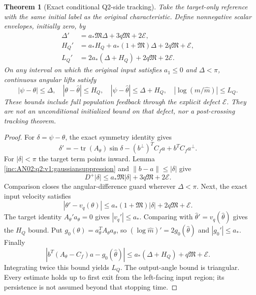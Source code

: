 \documentclass[11pt]{article}
\numberwithin{equation}{section}
\newtheorem{theorem}{Theorem}[section]\newtheorem{lemma}[theorem]{Lemma}
\theoremstyle{remark}\newtheorem{remark}[theorem]{Remark}
\begin{document}
\begin{theorem}[Exact conditional Q2-side tracking]
\label{inc:AN02:q2:v1:originaltracking}
Take the target-only reference with the same initial label as the original
characteristic. Define nonnegative scalar envelopes, initially zero, by
\begin{align}
 \Delta'&=a_*\mathfrak M\Delta+3q\mathfrak M+2\mathcal E,
 \label{inc:AN02:q2:v1:envelopes}\\
 H_Q'&=a_*H_Q+a_*(1+\mathfrak M)\Delta
                       +2q\mathfrak M+\mathcal E,\nonumber\\
 L_Q'&=2a_*(\Delta+H_Q)+2q\mathfrak M+2\mathcal E.\nonumber
\end{align}
On any interval on which the original input satisfies $a_1\le0$
and $\Delta<\pi$, continuous angular lifts satisfy
\begin{equation}\label{inc:AN02:q2:v1:trackingbounds}
 |\psi-\theta|\le\Delta,\quad
 |\theta-\widehat\theta|\le H_Q,\quad
 |\psi-\widehat\theta|\le\Delta+H_Q,\quad
 |\log(m/\widehat m)|\le L_Q.
\end{equation}
These bounds include full population feedback through the explicit defect
$\mathcal E$. They are not an unconditional initialized bound on that
defect, nor a post-crossing tracking theorem.
\end{theorem}
\begin{proof}
For $\delta=\psi-\theta$, the exact symmetry identity gives
\[
 \delta'=-\operatorname{tr}(A_\theta)\sin\delta
 -(b^\perp)^TC_fa+b^TC_fa^\perp.
\]
For $|\delta|<\pi$ the target term points inward. Lemma
\ref{inc:AN02:q2:v1:gaussiansuppression} and $\|b-a\|\le|\delta|$
give
\[
 D^+|\delta|\le a_*\mathfrak M|\delta|
                         +3q\mathfrak M+2\mathcal E.
\]
Comparison closes the angular-difference guard wherever $\Delta<\pi$.
Next, the exact input velocity satisfies
\[
 |\theta'-v_q(\theta)|
 \le a_*(1+\mathfrak M)|\delta|+2q\mathfrak M+\mathcal E.
\]
The target identity $A_\theta'a_\theta=0$ gives $|v_q'|\le a_*$.
Comparing with $\widehat\theta'=v_q(\widehat\theta)$ gives the
$H_Q$ bound. Put $g_0(\theta)=a_\theta^TA_\theta a_\theta$,
so $(\log\widehat m)'=2g_0(\widehat\theta)$ and
$|g_0'|\le a_*$. Finally
\[
 |b^T(A_\theta-C_f)a-g_0(\widehat\theta)|
 \le a_*(\Delta+H_Q)+q\mathfrak M+\mathcal E.
\]
Integrating twice this bound yields $L_Q$. The output-angle bound is
triangular. Every estimate holds up to first exit from the left-facing
input region; its persistence is not assumed beyond that stopping time.
\end{proof}
\end{document}
